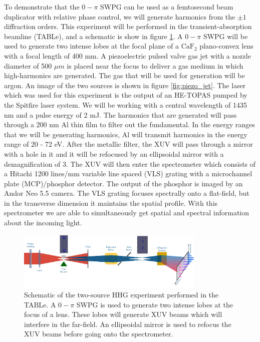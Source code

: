 To demonstrate that the $0-\pi$ SWPG can be used as a femtosecond beam duplicator with relative phase control, we will generate harmonics from the $\pm1$ diffraction orders.  This experiment will be performed in the transient-absorption beamline (TABLe), and a schematic is show in figure \ref{fig:schematic}.  A $0-\pi$ SWPG will be used to generate two intense lobes at the focal plane of a $\mathrm{CaF}_2$ plano-convex lens with a focal length of 400 mm.  A piezoelectric pulsed valve gas jet with a nozzle diameter of 500 $\mu m$ is placed near the focus to deliver a gas medium in which high-harmonics are generated.  The gas that will be used for generation will be argon.  An image of the two sources is shown in figure \ref{fig:piezo_jet}.  The laser which was used for this experiment is the output of an HE-TOPAS pumped by the Spitfire laser system.  We will be working with a central wavelength of 1435 nm and a pulse energy of 2 mJ.  The harmonics that are generated will pass through a 200 nm Al thin film to filter out the fundamental. In the energy ranges that we will be generating harmonics, Al will transmit harmonics in the energy range of 20 - 72 eV.  After the metallic filter, the XUV will pass through a mirror with a hole in it and it will be refocused by an ellipsoidal mirror with a demagnification of 3.  The XUV will then enter the spectrometer which consists of a Hitachi 1200 lines/mm variable line spaced (VLS) grating with a microchannel plate (MCP)/phosphor detector.  The output of the phosphor is imaged by an Andor Neo 5.5 camera.  The VLS grating focuses spectrally onto a flat-field, but in the transverse dimension it maintains the spatial profile. With this spectrometer we are able to simultaneously get spatial and spectral information about the incoming light.
\begin{figure}
	\centering
	\includegraphics[width=0.8\textwidth]{figures/Two_source/schematic_table.png}
	\caption[Schematic of two-source HHG]{Schematic of the two-source HHG experiment performed in the TABLe. A $0-\pi$ SWPG is used to generate two intense lobes at the focus of a lens.  These lobes will generate XUV beams which will interfere in the far-field.  An ellipsoidal mirror is used to refocus the XUV beams before going onto the spectrometer.}
	\label{fig:schematic}
\end{figure}
